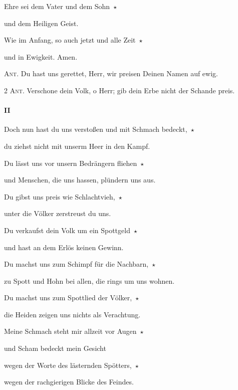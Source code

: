 \noindent Ehre sei dem Vater und dem Sohn~$\star$~\nopagebreak

und dem Heiligen Geist.

\noindent Wie im Anfang, so auch jetzt und alle Zeit~$\star$~\nopagebreak

und in Ewigkeit. Amen.

\vspace{10pt}

\noindent \textsc{Ant.} Du hast uns gerettet, Herr, wir preisen Deinen Namen auf ewig. 


\newpage

\noindent \textsc{2 Ant.} Verschone dein Volk, o Herr; gib dein Erbe nicht der Schande preis. \nopagebreak

\paragraph{II}

\noindent Doch nun hast du uns verstoßen und mit Schmach bedeckt,~$\star$~\nopagebreak

du ziehst nicht mit unserm Heer in den Kampf. 

 \noindent Du lässt uns vor unsern Bedrängern fliehen~$\star$~\nopagebreak

und Menschen, die uns hassen, plündern uns aus. 

 \noindent Du gibst uns preis wie Schlachtvieh,~$\star$~\nopagebreak

unter die Völker zerstreust du uns. 

 \noindent Du verkaufst dein Volk um ein Spottgeld~$\star$~\nopagebreak

und hast an dem Erlös keinen Gewinn. 

 \noindent Du machst uns zum Schimpf für die Nachbarn,~$\star$~\nopagebreak

zu Spott und Hohn bei allen, die rings um uns wohnen.

\noindent Du machst uns zum Spottlied der Völker,~$\star$~\nopagebreak

die Heiden zeigen uns nichts als Verachtung.

\noindent Meine Schmach steht mir allzeit vor Augen~$\star$~\nopagebreak

und Scham bedeckt mein Gesicht

\noindent wegen der Worte des lästernden Spötters,~$\star$~\nopagebreak

wegen der rachgierigen Blicke des Feindes.

